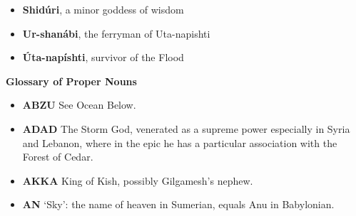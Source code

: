 \documentclass{article}
\begin{document}
\begin{multicols}{3}
\begin{small}
\begin{itemize}[
        label=,
        leftmargin=1.0em,
        itemindent=-1.0em,
        nosep,
    ]
    \item \textbf{Shidúri}, a minor goddess of wisdom

    \item \textbf{Ur-shanábi}, the ferryman of Uta-napishti

    \item \textbf{Úta-napíshti}, survivor of the Flood

\end{itemize}


\end{small}







\vspace{0.5em}
\noindent \textbf{Glossary of Proper Nouns}
\vspace{0.2em}

\begin{small}%
\begin{itemize}[
        label=,
        leftmargin=1.0em,
        itemindent=-1.0em,
        nosep,
    ]

    \item \textbf{ABZU}
    See Ocean Below.

    \item \textbf{ADAD}
    The Storm God, venerated as a supreme power especially in Syria and
    Lebanon, where in the epic he has a particular association with the
    Forest of Cedar.

    \item \textbf{AKKA} King of Kish, possibly Gilgamesh's nephew.

    \item \textbf{AN}
    `Sky': the name of heaven in Sumerian, equals Anu in Babylonian.


\end{itemize}
\end{small}
\end{multicols}
\end{document}
